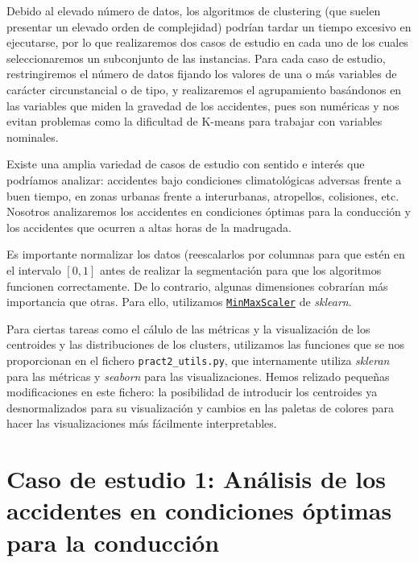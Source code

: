\documentclass[oneside]{book}
\begin{document}
  Debido al elevado número de datos, los algoritmos de clustering (que
  suelen presentar un elevado orden de complejidad) podrían tardar un
  tiempo excesivo en ejecutarse, por lo que realizaremos dos casos de
  estudio en cada uno de los cuales seleccionaremos un subconjunto de
  las instancias. Para cada caso de estudio, restringiremos el número
  de datos fijando los valores de una o más variables de carácter
  circunstancial o de tipo, y realizaremos el agrupamiento basándonos
  en las variables que miden la gravedad de los accidentes, pues son
  numéricas y nos evitan problemas como la dificultad de K-means para
  trabajar con variables nominales.

  Existe una amplia variedad de casos de estudio con sentido e interés
  que podríamos analizar: accidentes bajo condiciones climatológicas
  adversas frente a buen tiempo, en zonas urbanas frente a
  interurbanas, atropellos, colisiones, etc. Nosotros analizaremos los
  accidentes en condiciones óptimas para la conducción
  y los accidentes que ocurren a altas horas de la madrugada.

  Es importante normalizar los datos (reescalarlos por columnas para
  que estén en el intervalo $[0,1]$ antes de realizar la segmentación
  para que los algoritmos funcionen correctamente. De lo contrario,
  algunas dimensiones cobrarían más importancia que otras. Para ello,
  utilizamos
  \href{https://scikit-learn.org/stable/modules/generated/sklearn.preprocessing.MinMaxScaler.html}{\texttt{MinMaxScaler}}
  de \textit{sklearn}.

  Para ciertas tareas como el cálulo de las métricas y la
  visualización de los centroides y las distribuciones de los
  clusters, utilizamos las funciones que se nos proporcionan en el
  fichero \texttt{pract2\_utils.py}, que internamente utiliza
  \textit{skleran} para las métricas y \textit{seaborn} para las
  visualizaciones. Hemos relizado pequeñas modificaciones en este
  fichero: la posibilidad de introducir los centroides ya
  desnormalizados para su visualización y cambios en las paletas de
  colores para hacer las visualizaciones más fácilmente interpretables.
  
  \section{Caso de estudio 1: Análisis de los accidentes en
    condiciones óptimas para la conducción}%
\end{document}
